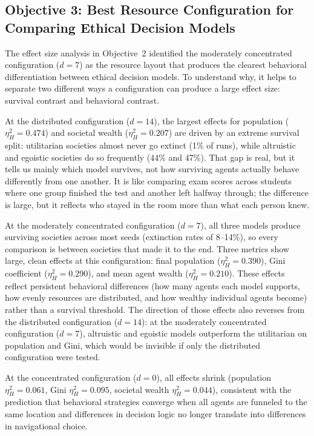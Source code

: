 \documentclass{icsthesis}
\begin{document}
\begin{mainmatter}
		\subsection{Objective 3: Best Resource Configuration for Comparing Ethical Decision Models}

The effect size analysis in Objective~2 identified the moderately concentrated configuration ($d = 7$) as the resource layout that produces the clearest behavioral differentiation between ethical decision models. To understand why, it helps to separate two different ways a configuration can produce a large effect size: survival contrast and behavioral contrast.

At the distributed configuration ($d = 14$), the largest effects for population ($\eta^2_H = 0.474$) and societal wealth ($\eta^2_H = 0.207$) are driven by an extreme survival split: utilitarian societies almost never go extinct (1\% of runs), while altruistic and egoistic societies do so frequently (44\% and 47\%). That gap is real, but it tells us mainly which model survives, not how surviving agents actually behave differently from one another. It is like comparing exam scores across students where one group finished the test and another left halfway through; the difference is large, but it reflects who stayed in the room more than what each person knew.

At the moderately concentrated configuration ($d = 7$), all three models produce surviving societies across most seeds (extinction rates of 8--14\%), so every comparison is between societies that made it to the end. Three metrics show large, clean effects at this configuration: final population ($\eta^2_H = 0.390$), Gini coefficient ($\eta^2_H = 0.290$), and mean agent wealth ($\eta^2_H = 0.210$). These effects reflect persistent behavioral differences (how many agents each model supports, how evenly resources are distributed, and how wealthy individual agents become) rather than a survival threshold. The direction of those effects also reverses from the distributed configuration ($d = 14$): at the moderately concentrated configuration ($d = 7$), altruistic and egoistic models outperform the utilitarian on population and Gini, which would be invisible if only the distributed configuration were tested.

At the concentrated configuration ($d = 0$), all effects shrink (population $\eta^2_H = 0.061$, Gini $\eta^2_H = 0.095$, societal wealth $\eta^2_H = 0.044$), consistent with the prediction that behavioral strategies converge when all agents are funneled to the same location and differences in decision logic no longer translate into differences in navigational choice.


\end{mainmatter}
\end{document}
